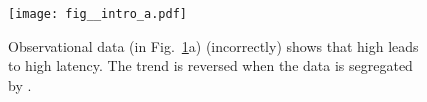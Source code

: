 
\begin{figure}[t]
    \setlength{\belowcaptionskip}{-1.25em}
    \centering
    \texttt{[image: fig\_\_intro\_a.pdf]}
    \caption{Observational data (in Fig.~\protect\ref{fig:intro_fig}a)  (incorrectly) shows that high \gpugrowth leads to high latency. The trend is reversed when the data is segregated by \swapmem.}
    \label{fig:intro_fig}
\end{figure}

